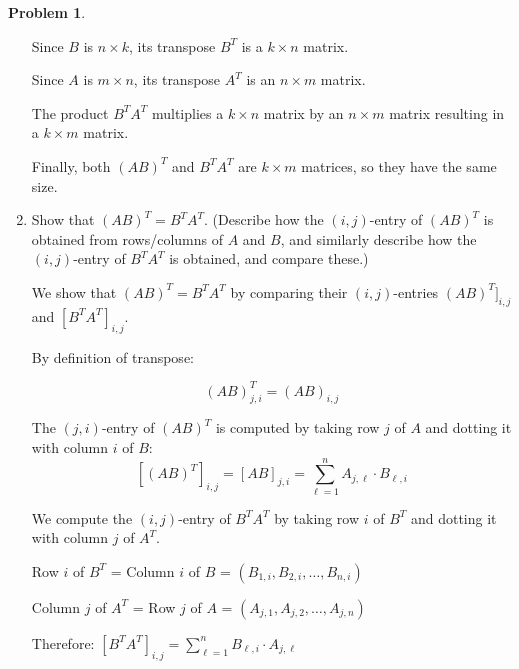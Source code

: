 \documentclass[12pt, oneside]{amsart}
\theoremstyle{definition}
\newtheorem{prob}{Problem}
\begin{document}
\begin{prob}
\begin{enumerate}
\begin{solution}
    Since $B$ is $n \times k$, its transpose $B^T$ is a $k \times n$ matrix.
    
    Since $A$ is $m \times n$, its transpose $A^T$ is an $n \times m$ matrix.
    
    The product $B^T A^T$ multiplies a $k \times n$ matrix by an $n \times m$ matrix resulting in a $k \times m$ matrix.
    
    \vspace{0.3cm}
    
    Finally, both $(AB)^T$ and $B^T A^T$ are $k \times m$ matrices, so they have the same size.
    \end{solution}
    
    \item Show that $(AB)^T = B^T A^T$. 
    (Describe how the $(i,j)$-entry of $(AB)^T$ is obtained from rows/columns of $A$ and $B$, and similarly describe how the $(i,j)$-entry of $B^T A^T$ is obtained, and compare these.)
    
    \begin{solution}
    We show that $(AB)^T = B^T A^T$ by comparing their $(i,j)$-entries $(AB)^T]_{i,j}$ and $[B^T A^T]_{i,j}$.
    
    \vspace{0.3cm}
    
    By definition of transpose:
    
    \[
    (AB)^T_{j,i} = (A B)_{i,j}
    \]
    
    The $(j,i)$-entry of $(AB)^T$ is computed by taking row $j$ of $A$ and dotting it with column $i$ of $B$:
    \[
    [(AB)^T]_{i,j} = [AB]_{j,i} = \sum_{\ell=1}^{n} A_{j,\ell} \cdot B_{\ell,i}
    \]
    
    \vspace{0.3cm}
    
    We compute the $(i,j)$-entry of $B^T A^T$ by taking row $i$ of $B^T$ and dotting it with column $j$ of $A^T$. 
    
    \hspace{2em} Row $i$ of $B^T$ = Column $i$ of $B$ = $(B_{1,i}, B_{2,i}, \ldots, B_{n,i})$

    \hspace{2em} Column $j$ of $A^T$ = Row $j$ of $A$ = $(A_{j,1}, A_{j,2}, \ldots, A_{j,n})$

    
    Therefore:
    $[B^T A^T]_{i,j} = \sum_{\ell=1}^{n} B_{\ell,i} \cdot A_{j,\ell}$
    
    \vspace{0.3cm}


\end{solution}
\end{enumerate}
\end{prob}
\end{document}

